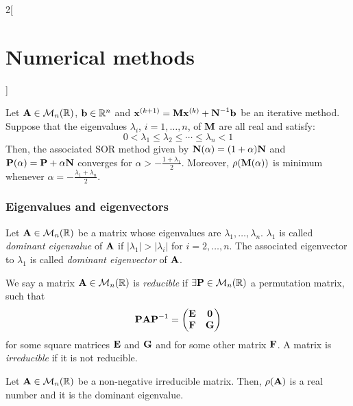 \documentclass[../../../main_math.tex]{subfiles}
\begin{document}
\begin{multicols}{2}[\section{Numerical methods}]
\begin{definition}
  \end{definition}
  \begin{theorem}
    Let $\boldsymbol{\mathrm{A}}\in\mathcal{M}_n(\mathbb{R})$, $\boldsymbol{\mathrm{b}}\in\mathbb{R}^n$ and $\boldsymbol{\mathrm{x}}^{(k+1)}=\boldsymbol{\mathrm{M}}\boldsymbol{\mathrm{x}}^{(k)}+\boldsymbol{\mathrm{N}}^{-1}\boldsymbol{\mathrm{b}}$ be an iterative method. Suppose that the eigenvalues $\lambda_i$, $i=1,\ldots,n$, of $\boldsymbol{\mathrm{M}}$ are all real and satisfy: $$0<\lambda_1\leq\lambda_2\leq\cdots\leq\lambda_n<1$$
    Then, the associated SOR method given by $\boldsymbol{\mathrm{N}}(\alpha)=(1+\alpha)\boldsymbol{\mathrm{N}}$ and $\boldsymbol{\mathrm{P}}(\alpha)=\boldsymbol{\mathrm{P}}+\alpha\boldsymbol{\mathrm{N}}$ converges for $\alpha>-\frac{1+\lambda_1}{2}$. Moreover, $\rho(\boldsymbol{\mathrm{M}}(\alpha))$ is minimum whenever $\alpha=-\frac{\lambda_1+\lambda_n}{2}$.
  \end{theorem}
  \subsubsection{Eigenvalues and eigenvectors}
  \begin{definition}
    Let $\boldsymbol{\mathrm{A}}\in\mathcal{M}_n(\mathbb{R})$ be a matrix whose eigenvalues are $\lambda_1,\ldots,\lambda_n$. $\lambda_1$ is called \emph{dominant eigenvalue} of $\boldsymbol{\mathrm{A}}$ if $|\lambda_1|>|\lambda_i|$ for $i=2,\ldots,n$. The associated eigenvector to $\lambda_1$ is called \emph{dominant eigenvector} of $\boldsymbol{\mathrm{A}}$.
  \end{definition}
  \begin{definition}
    We say a matrix $\boldsymbol{\mathrm{A}}\in\mathcal{M}_n(\mathbb{R})$ is \emph{reducible} if $\exists\boldsymbol{\mathrm{P}}\in\mathcal{M}_n(\mathbb{R})$ a permutation matrix, such that $$\boldsymbol{\mathrm{P}}\boldsymbol{\mathrm{A}}\boldsymbol{\mathrm{P}}^{-1}=
      \begin{pmatrix}
        \boldsymbol{\mathrm{E}} & \boldsymbol{\mathrm{0}} \\
        \boldsymbol{\mathrm{F}} & \boldsymbol{\mathrm{G}}
      \end{pmatrix}$$ for some square matrices $\boldsymbol{\mathrm{E}}$ and $\boldsymbol{\mathrm{G}}$ and for some other matrix $\boldsymbol{\mathrm{F}}$. A matrix is \emph{irreducible} if it is not reducible.
  \end{definition}
  \begin{theorem}
    Let $\boldsymbol{\mathrm{A}}\in\mathcal{M}_n(\mathbb{R})$ be a non-negative irreducible matrix. Then, $\rho(\boldsymbol{\mathrm{A}})$ is a real number and it is the dominant eigenvalue.
  \end{theorem}
  \begin{proposition}

\end{proposition}
\end{multicols}
\end{document}

